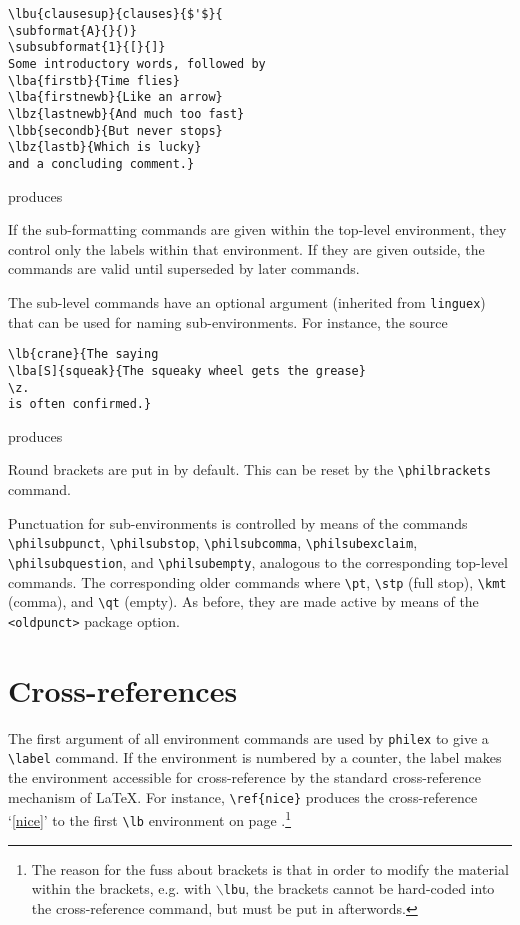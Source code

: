 \documentclass[10pt]{article}
\newcommand{\note}{\footnote}
\begin{document}
\begin{verbatim}
\lbu{clausesup}{clauses}{$'$}{
\subformat{A}{}{)}
\subsubformat{1}{[}{]}
Some introductory words, followed by 
\lba{firstb}{Time flies}	
\lba{firstnewb}{Like an arrow} 
\lbz{lastnewb}{And much too fast}
\lbb{secondb}{But never stops}
\lbz{lastb}{Which is lucky}
and a concluding comment.}
\end{verbatim}

produces


If the sub-formatting commands are  given within the top-level environment, they control only the labels within that environment. If they are given outside, the commands are valid until superseded by later commands. 

The sub-level commands  have an optional argument (inherited from \verb+linguex+) that can be used for naming sub-environments. For instance, the source

\begin{verbatim}
\lb{crane}{The saying
\lba[S]{squeak}{The squeaky wheel gets the grease}
\z.
is often confirmed.}
\end{verbatim}
	produces 


	Round brackets are put in by default. This can be reset by the \verb+\philbrackets+ command.

Punctuation for sub-environments  is controlled by means of the commands \verb+\philsubpunct+, \verb+\philsubstop+, \verb+\philsubcomma+, \verb+\philsubexclaim+, \verb+\philsubquestion+, and \verb+\philsubempty+, analogous to the corresponding top-level commands. The corresponding older commands where \verb+\pt+, \verb+\stp+ (full stop), \verb+\kmt+ (comma), and \verb+\qt+ (empty). As before, they are made active by means of the \verb+<oldpunct>+ package option.
	
\section{Cross-references}
The first argument of all environment commands are used by \verb+philex+ to give a \verb+\label+ command. If the environment is numbered by a counter, the label makes the environment accessible for cross-reference by the standard cross-reference mechanism of LaTeX. For instance, \verb+\ref{nice}+ produces the cross-reference `\ref{nice}' to the first \verb+\lb+ environment on page \pageref{nice}.\note
	{The reason for the fuss about brackets is that in order to modify the material within the brackets, e.g. with {\tt \(\backslash\)lbu}, the brackets cannot be hard-coded into the cross-reference command, but must be put in afterwords.}
	
\end{document}
